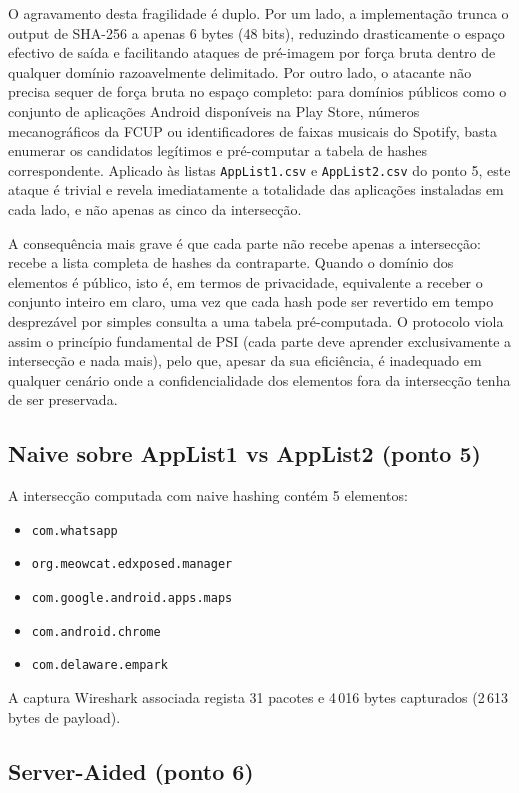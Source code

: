 O agravamento desta fragilidade é duplo. Por um lado, a implementação trunca o output de SHA-256 a apenas 6 bytes (48 bits), reduzindo drasticamente o espaço efectivo de saída e facilitando ataques de pré-imagem por força bruta dentro de qualquer domínio razoavelmente delimitado. Por outro lado, o atacante não precisa sequer de força bruta no espaço completo: para domínios públicos como o conjunto de aplicações Android disponíveis na Play Store, números mecanográficos da FCUP ou identificadores de faixas musicais do Spotify, basta enumerar os candidatos legítimos e pré-computar a tabela de hashes correspondente. Aplicado às listas \texttt{AppList1.csv} e \texttt{AppList2.csv} do ponto 5, este ataque é trivial e revela imediatamente a totalidade das aplicações instaladas em cada lado, e não apenas as cinco da intersecção.

A consequência mais grave é que cada parte não recebe apenas a intersecção: recebe a lista completa de hashes da contraparte. Quando o domínio dos elementos é público, isto é, em termos de privacidade, equivalente a receber o conjunto inteiro em claro, uma vez que cada hash pode ser revertido em tempo desprezável por simples consulta a uma tabela pré-computada. O protocolo viola assim o princípio fundamental de PSI (cada parte deve aprender exclusivamente a intersecção e nada mais), pelo que, apesar da sua eficiência, é inadequado em qualquer cenário onde a confidencialidade dos elementos fora da intersecção tenha de ser preservada.

\subsection{Naive sobre AppList1 vs AppList2 (ponto 5)}
\label{sec:naive_apps}

A intersecção computada com naive hashing contém 5 elementos:
\begin{itemize}\itemsep0pt
  \item \texttt{com.whatsapp}
  \item \texttt{org.meowcat.edxposed.manager}
  \item \texttt{com.google.android.apps.maps}
  \item \texttt{com.android.chrome}
  \item \texttt{com.delaware.empark}
\end{itemize}

A captura Wireshark associada regista 31 pacotes e 4\,016 bytes capturados (2\,613 bytes de payload).

\subsection{Server-Aided (ponto 6)}
\label{sec:srv_aided}

